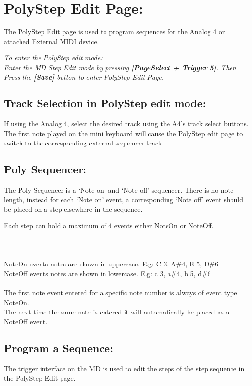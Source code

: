 \chapter{PolyStep Edit Page:}
The PolyStep Edit page is used to program sequences for the Analog 4 or attached External MIDI device.


\textit{To enter the PolyStep edit mode:\\Enter the MD Step Edit mode by pressing \textbf{[PageSelect + Trigger 5]}. Then Press the \textbf{[Save]} button to enter PolyStep Edit Page.}\\
\section{Track Selection in PolyStep edit mode:}
If using the Analog 4, select the desired track using the A4’s track select buttons. The first note played on the mini keyboard will cause the PolyStep edit page to switch to  the corresponding external sequencer track.
\section{Poly Sequencer: }
The Poly Sequencer is a ‘Note on’ and ‘Note off’ sequencer. There is no note length, instead for each ‘Note on’ event, a corresponding ‘Note off’ event should be placed on a step elsewhere in the sequence.

Each step can hold a maximum of 4 events either NoteOn or NoteOff.\\\\
\\
\\
NoteOn events notes are shown in uppercase. E.g: C 3, A\#4, B 5, D\#6
\\NoteOff events notes are shown in lowercase. E.g: c 3, a\#4, b 5, d\#6
\\\\
The first note event entered for a specific note number is always of event type NoteOn.\\
The next time the same note is entered it will automatically be placed as a NoteOff event.


\section{Program a Sequence: }
The trigger interface on the MD is used to edit the steps of the step sequence in the PolyStep Edit page.

